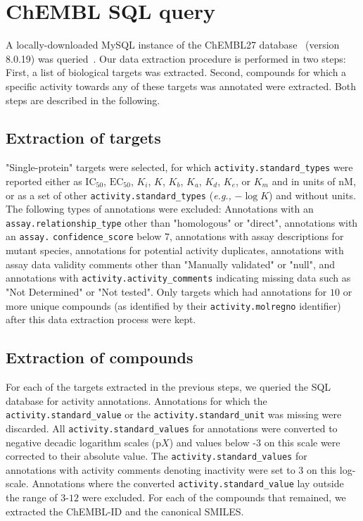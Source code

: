 \section{ChEMBL SQL query}
A locally-downloaded MySQL instance of the ChEMBL27 database~\cite{mendez2019chembl} (version 8.0.19) was queried~\cite{mysql}. Our data extraction procedure is performed in two steps: First, a list of biological targets was extracted. Second, compounds for which a specific activity towards any of these targets was annotated were extracted. Both steps are described in the following. 

\subsection{Extraction of targets}
"Single-protein" targets were selected, for which \texttt{activity.standard\_types} were reported either as $\mathrm{IC}_{50}$, $\mathrm{EC}_{50}$, $K_i$, $K$, $K_b$, $K_a$, $K_d$, $K_e$, or $K_m$ and in units of nM, or as a set of other \texttt{activity.standard\_types} (\textit{e.g.,} $-\log K$) and without units. The following types of annotations were excluded: Annotations with an \texttt{assay.relationship\_type} other than "homologous" or "direct", annotations with an \texttt{assay.} \texttt{confidence\_score} below $7$, annotations with assay descriptions for mutant species, annotations for potential activity duplicates, annotations with assay data validity comments other than "Manually validated" or "null", and  annotations with \texttt{activity.activity\_comments} indicating missing data such as "Not Determined" or "Not tested". Only targets which had annotations for $10$ or more unique compounds (as identified by their \texttt{activity.molregno} identifier) after this data extraction process were kept. 

\subsection{Extraction of compounds}
For each of the targets extracted in the previous steps, we queried the SQL database for activity annotations. Annotations for which the \texttt{activity.standard\_value} or the \texttt{activity.standard\_unit} was missing were discarded. All \texttt{activity.standard\_values} for annotations were converted to negative decadic logarithm scales (p$X$) and values below -3 on this scale were corrected to their absolute value. The  \texttt{activity.standard\_values} for annotations with activity comments denoting inactivity were set to $3$ on this log-scale. Annotations where the converted \texttt{activity.standard\_value} lay outside the range of $3$-$12$ were excluded. For each of the compounds that remained, we extracted the ChEMBL-ID and the canonical SMILES. 







